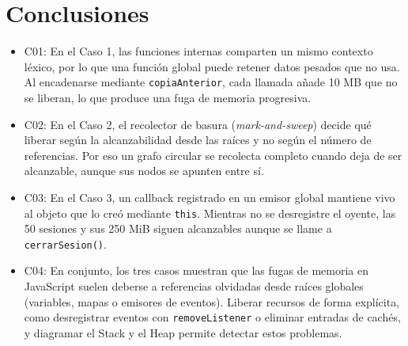 \documentclass[a4paper,11pt]{article} %
\begin{document}
\section*{Conclusiones}

\begin{itemize}
   \item C01: En el Caso 1, las funciones internas comparten un mismo contexto léxico, por lo que una función global puede retener datos pesados que no usa. Al encadenarse mediante \texttt{copiaAnterior}, cada llamada añade 10 MB que no se liberan, lo que produce una fuga de memoria progresiva.
   \item C02: En el Caso 2, el recolector de basura (\textit{mark-and-sweep}) decide qué liberar según la alcanzabilidad desde las raíces y no según el número de referencias. Por eso un grafo circular se recolecta completo cuando deja de ser alcanzable, aunque sus nodos se apunten entre sí.
   \item C03: En el Caso 3, un callback registrado en un emisor global mantiene vivo al objeto que lo creó mediante \texttt{this}. Mientras no se desregistre el oyente, las 50 sesiones y sus 250 MiB siguen alcanzables aunque se llame a \texttt{cerrarSesion()}.
   \item C04: En conjunto, los tres casos muestran que las fugas de memoria en JavaScript suelen deberse a referencias olvidadas desde raíces globales (variables, mapas o emisores de eventos). Liberar recursos de forma explícita, como desregistrar eventos con \texttt{removeListener} o eliminar entradas de cachés, y diagramar el Stack y el Heap permite detectar estos problemas.
\end{itemize}
\end{document}

